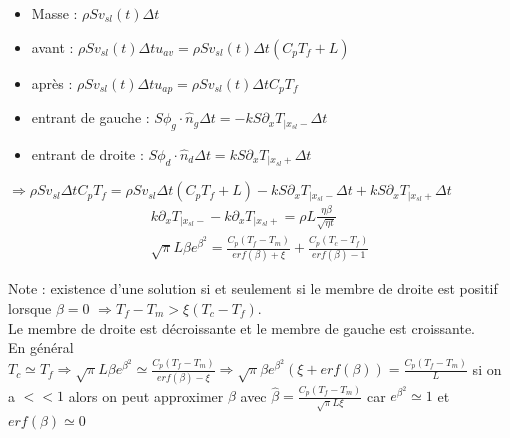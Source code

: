 \documentclass[../main.tex]{subfiles}
\begin{document}
\begin{itemize}
    \item Masse : $\rho S v_{sl}(t) \Delta t$\\
    \item avant : $\rho S  v_{sl}(t) \Delta t u_{av} = \rho S v_{sl}(t) \Delta t(C_pT_f+L)$\\
    \item après : $\rho S v_{sl}(t) \Delta t u_{ap} = \rho S v_{sl}(t) \Delta t C_pT_f$\\
    \item entrant de gauche : $S \phi_g \cdot \hat{n}_g \Delta t = -kS \partial_x T_{\lvert x_{sl}-}\Delta t$\\
    \item entrant de droite : $S\phi_d \cdot \hat{n}_d \Delta t = k S \partial_x T_{\lvert x_{sl}+} \Delta t$\\
\end{itemize}
$\Rightarrow \rho S v_{sl} \Delta t C_p T_f = \rho S v_{sl} \Delta t (C_p T_f+L)-kS \partial_x T_{\lvert x_{sl}-} \Delta t + kS \partial_x T_{\lvert x_{sl}+}\Delta t$\\

\begin{equation}
    \begin{gathered}
        k \partial_x T_{\lvert x_{sl}-} - k \partial_x T_{\lvert x_{sl}+} = \rho L \frac{\eta \beta}{\sqrt{\eta t}}\\
        \sqrt{\pi} L \beta e^{\beta^2} = \frac{C_p (T_f-T_m)}{erf(\beta)+\xi} + \frac{C_p(T_c-T_f)}{erf(\beta)-1}
    \end{gathered}
\end{equation}

\color{gray} Note : existence d'une solution si et seulement si le membre de droite est positif lorsque $\beta = 0$ $\Rightarrow T_f-T_m > \xi(T_c-T_f)$.\\
Le membre de droite est décroissante et le membre de gauche est croissante.\\

En général $T_c \simeq T_f \Rightarrow \sqrt{\pi}L\beta e^{\beta^2} \simeq \frac{C_p(T_f-T_m)}{erf(\beta)-\xi} \Rightarrow \sqrt{\pi} \beta e^{\beta^2} (\xi +erf(\beta)) = \frac{C_p(T_f-T_m)}{L}$ si on a $<<1$ alors on peut approximer $\beta$ avec $\hat{\beta} = \frac{C_p(T_f-T_m)}{\sqrt{\pi}L\xi}$ car $e^{\beta^2}\simeq 1$ et $erf(\beta)\simeq 0$\\
\color{black}\\
\end{document}
